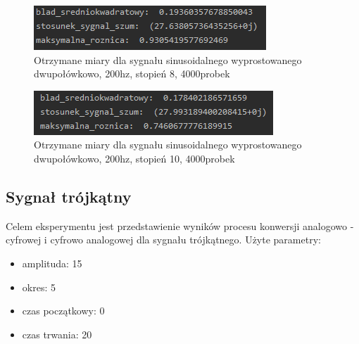 \documentclass[12pt]{article}
\begin{document}
\begin{figure}[H]
\centering
\includegraphics[scale=0.9]{444sinusDwuMiarySt8.png}
\caption{Otrzymane miary dla sygnału sinusoidalnego wyprostowanego dwupołówkowo, 200hz, stopień 8, 4000probek}
\end{figure}

\begin{figure}[H]
\centering
\includegraphics[scale=0.9]{444sinusDwuMiarySt10.png}
\caption{Otrzymane miary dla sygnału sinusoidalnego wyprostowanego dwupołówkowo, 200hz, stopień 10, 4000probek}
\end{figure}

\subsection{Sygnał trójkątny}
Celem eksperymentu jest przedstawienie wyników procesu konwersji analogowo - cyfrowej i cyfrowo analogowej dla sygnału trójkątnego.
Użyte parametry:
\begin{itemize}
\item amplituda: 15
\item okres: 5
\item czas początkowy: 0
\item czas trwania: 20
\end{itemize}
\end{document}
